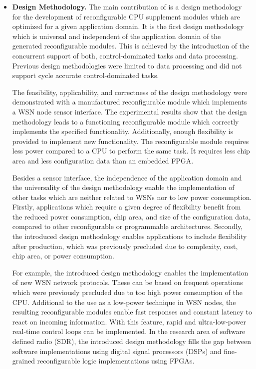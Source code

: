 \documentclass[a4paper,12pt,onsided]{article}
\begin{document}
\begin{itemize}
  \item \textbf{Design Methodology.}
    The main contribution of \cite{Gla15} is a design methodology for the
    development of reconfigurable CPU supplement modules which are optimized
    for a given application domain.
    It is the first design methodology which is universal and independent of
    the application domain of the generated reconfigurable modules.
    This is achieved by the introduction of the concurrent support of both,
    control-dominated tasks and data processing.
    Previous design methodologies were limited to data processing and did not
    support cycle accurate control-dominated tasks.

    The feasibility, applicability, and correctness of the design methodology
    were demonstrated with a manufactured reconfigurable module which
    implements a WSN node sensor interface.
    The experimental results show that the design methodology leads to a
    functioning reconfigurable module which correctly implements the specified
    functionality.
    Additionally, enough flexibility is provided to implement new
    functionality. The reconfigurable module requires less power compared to a
    CPU to perform the same task.
    It requires less chip area and less configuration data than an embedded
    FPGA.

    Besides a sensor interface, the independence of the application domain and
    the universality of the design methodology enable the implementation of
    other tasks which are neither related to WSNs nor to low power consumption.
    Firstly, applications which require a given degree of flexibility benefit
    from the reduced power consumption, chip area, and size of the
    configuration data, compared to other reconfigurable or programmable
    architectures.
    Secondly, the introduced design methodology enables applications to
    include flexibility after production, which was previously precluded
    due to complexity, cost, chip area, or power consumption.

    For example, the introduced design methodology enables the implementation
    of new WSN network protocols. These can be based on frequent operations
    which were previously precluded due to too high power consumption of the
    CPU.
    Additional to the use as a low-power technique in WSN nodes, the resulting
    reconfigurable modules enable fast responses and constant latency to react
    on incoming information. With this feature, rapid and ultra-low-power
    real-time control loops can be implemented.
    In the research area of software defined radio (SDR), the introduced design
    methodology fills the gap between software implementations using digital
    signal processors (DSPs) and fine-grained reconfigurable logic
    implementations using FPGAs.


\end{itemize}
\end{document}
